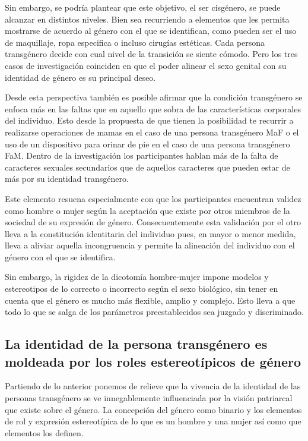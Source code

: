 Sin embargo, se podría plantear que este objetivo, el ser cisgénero, se puede
alcanzar en distintos niveles. Bien sea recurriendo a elementos que les permita
mostrarse de acuerdo al género con el que se identifican, como pueden ser el uso
de maquillaje, ropa especifica o incluso cirugías estéticas. Cada persona
transgénero decide con cual nivel de la transición se siente cómodo. Pero los
tres casos de investigación coinciden en que el poder alinear el sexo genital
con su identidad de género es su principal deseo.

Desde esta perspectiva también es posible afirmar que la condición transgénero
se enfoca más en las faltas que en aquello que sobra de las características
corporales del individuo. Esto desde la propuesta de que tienen la posibilidad
te recurrir a realizarse operaciones de mamas en el caso de una persona
transgénero MaF o el uso de un dispositivo para orinar de pie en el caso de una
persona transgénero FaM. Dentro de la investigación los participantes hablan más
de la falta de caracteres sexuales secundarios que de aquellos caracteres que
pueden estar de más por su identidad transgénero.

Este elemento resuena especialmente con que los
participantes encuentran validez como hombre o mujer según la aceptación
que existe por otros miembros de la sociedad de su expresión de género.
Consecuentemente esta validación por el otro lleva a la constitución
identitaria del individuo pues, en mayor o menor medida, lleva a aliviar
aquella incongruencia y permite la alineación del individuo con el género con el
que se identifica.

Sin embargo, la rigidez de la dicotomía hombre-mujer impone modelos y
estereotipos de lo correcto o incorrecto según el sexo biológico, sin tener en
cuenta que el género es mucho más flexible, amplio y complejo. Esto lleva a que
todo lo que se salga de los parámetros preestablecidos sea juzgado y
discriminado.

\subsection[La identidad es moldeada por el patriarcado]{La identidad de la persona
transgénero es moldeada por los roles estereotípicos de género}

Partiendo de lo anterior ponemos de relieve que la vivencia de la identidad de
las personas transgénero se ve innegablemente influenciada por la visión
patriarcal que existe sobre el género. La concepción del género como binario y
los elementos de rol y expresión estereotípica de lo que es un hombre y una
mujer así como que elementos los definen.


